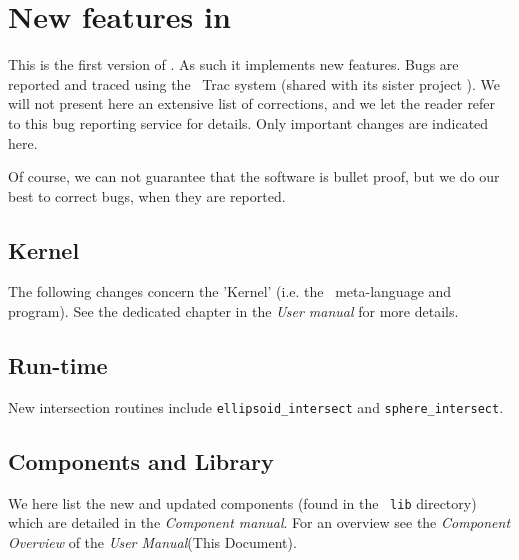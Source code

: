 
\chapter{New features in \MCX\ \version\ }
\label{c:changes}

This is the first version of \MCX. As such it implements new features. Bugs are
reported and traced using the \MCX\ Trac system \cite{mccode_trac_webpage}
(shared with its sister project \MCS). We will not present here an extensive
list of corrections, and we let the reader refer to this bug reporting service
for details. Only important changes are indicated here.

Of course, we can not guarantee that the software is bullet proof, but we do our best to correct bugs, when they are reported.


\section{Kernel}
\label{s:new-features:kernel}

The following changes concern the 'Kernel' (i.e. the \MCX\ meta-language and program). See the dedicated chapter in the \textit{User manual} for more details.

\section{Run-time}
\label{s:new-features:run-time}
New intersection routines include \verb+ellipsoid_intersect+ and \verb+sphere_intersect+.


\section{Components and Library}
\label{s:new-features:components}
 
We here list the new and updated components (found in the \MCX\ \verb+lib+ directory)
which are detailed in the \textit{Component manual}. For an overview see the \textit{Component Overview} of the \textit{User Manual}(This Document).
